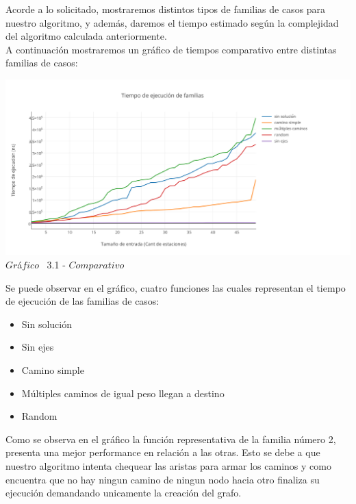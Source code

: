 \indent Acorde a lo solicitado, mostraremos distintos tipos de familias de casos para nuestro algoritmo, y adem\'as, daremos el tiempo estimado 
seg\'un la complejidad del algoritmo calculada anteriormente.\\

A continuaci\'on mostraremos un gr\'afico de tiempos comparativo entre distintas familias de casos:\\ 

\vspace*{0.3cm} \vspace*{0.3cm}
  \begin{center}
 \includegraphics[scale=0.65]{./EJ3/comparativo.png}
 {$Gr$\'a$fico$ \ 3.1 - $Comparativo$}
  \end{center}
  \vspace*{0.3cm}
  
Se puede observar en el gr\'afico, cuatro funciones las cuales representan el tiempo de ejecuci\'on de las familias de casos:\\
\begin{itemize}
\item Sin solución
\item Sin ejes
\item Camino simple
\item Múltiples caminos de igual peso llegan a destino
\item Random
\end{itemize}

Como se observa en el gr\'afico la funci\'on representativa de la familia n\'umero 2, presenta una mejor performance en relaci\'on a las otras. Esto se debe a que nuestro algoritmo intenta chequear las aristas para armar los caminos y como encuentra que no hay ningun camino de ningun nodo hacia otro finaliza su ejecuci\'on demandando unicamente la creaci\'on del grafo.

